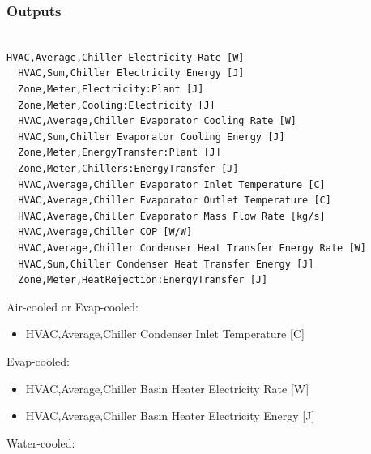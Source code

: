 \subsubsection{Outputs}\label{outputs-6-006}

\begin{lstlisting}

HVAC,Average,Chiller Electricity Rate [W]
  HVAC,Sum,Chiller Electricity Energy [J]
  Zone,Meter,Electricity:Plant [J]
  Zone,Meter,Cooling:Electricity [J]
  HVAC,Average,Chiller Evaporator Cooling Rate [W]
  HVAC,Sum,Chiller Evaporator Cooling Energy [J]
  Zone,Meter,EnergyTransfer:Plant [J]
  Zone,Meter,Chillers:EnergyTransfer [J]
  HVAC,Average,Chiller Evaporator Inlet Temperature [C]
  HVAC,Average,Chiller Evaporator Outlet Temperature [C]
  HVAC,Average,Chiller Evaporator Mass Flow Rate [kg/s]
  HVAC,Average,Chiller COP [W/W]
  HVAC,Average,Chiller Condenser Heat Transfer Energy Rate [W]
  HVAC,Sum,Chiller Condenser Heat Transfer Energy [J]
  Zone,Meter,HeatRejection:EnergyTransfer [J]
\end{lstlisting}

Air-cooled or Evap-cooled:

\begin{itemize}
\tightlist
\item
  HVAC,Average,Chiller Condenser Inlet Temperature {[}C{]}
\end{itemize}

Evap-cooled:

\begin{itemize}
\item
  HVAC,Average,Chiller Basin Heater Electricity Rate {[}W{]}
\item
  HVAC,Average,Chiller Basin Heater Electricity Energy {[}J{]}
\end{itemize}

Water-cooled:

